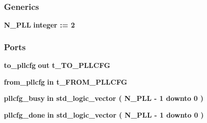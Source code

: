 \subsubsection*{Generics}
 \begin{DoxyCompactItemize}
\item 
{\bf N\+\_\+\+P\+LL} {\bfseries {\bfseries \textcolor{comment}{integer}\textcolor{vhdlchar}{ }\textcolor{vhdlchar}{ }\textcolor{vhdlchar}{\+:}\textcolor{vhdlchar}{=}\textcolor{vhdlchar}{ }\textcolor{vhdlchar}{ } \textcolor{vhdldigit}{2} \textcolor{vhdlchar}{ }}}
\end{DoxyCompactItemize}
\subsubsection*{Ports}
 \begin{DoxyCompactItemize}
\item 
{\bf to\+\_\+pllcfg}  {\bfseries {\bfseries \textcolor{keywordflow}{out}\textcolor{vhdlchar}{ }}} {\bfseries {\bfseries {\bf t\+\_\+\+T\+O\+\_\+\+P\+L\+L\+C\+FG}} \textcolor{vhdlchar}{ }} 
\item 
{\bf from\+\_\+pllcfg}  {\bfseries {\bfseries \textcolor{keywordflow}{in}\textcolor{vhdlchar}{ }}} {\bfseries {\bfseries {\bf t\+\_\+\+F\+R\+O\+M\+\_\+\+P\+L\+L\+C\+FG}} \textcolor{vhdlchar}{ }} 
\item 
{\bf pllcfg\+\_\+busy}  {\bfseries {\bfseries \textcolor{keywordflow}{in}\textcolor{vhdlchar}{ }}} {\bfseries \textcolor{comment}{std\+\_\+logic\+\_\+vector}\textcolor{vhdlchar}{ }\textcolor{vhdlchar}{(}\textcolor{vhdlchar}{ }\textcolor{vhdlchar}{ }\textcolor{vhdlchar}{ }\textcolor{vhdlchar}{ }{\bfseries {\bf N\+\_\+\+P\+LL}} \textcolor{vhdlchar}{-\/}\textcolor{vhdlchar}{ } \textcolor{vhdldigit}{1} \textcolor{vhdlchar}{ }\textcolor{keywordflow}{downto}\textcolor{vhdlchar}{ }\textcolor{vhdlchar}{ } \textcolor{vhdldigit}{0} \textcolor{vhdlchar}{ }\textcolor{vhdlchar}{)}\textcolor{vhdlchar}{ }} 
\item 
{\bf pllcfg\+\_\+done}  {\bfseries {\bfseries \textcolor{keywordflow}{in}\textcolor{vhdlchar}{ }}} {\bfseries \textcolor{comment}{std\+\_\+logic\+\_\+vector}\textcolor{vhdlchar}{ }\textcolor{vhdlchar}{(}\textcolor{vhdlchar}{ }\textcolor{vhdlchar}{ }\textcolor{vhdlchar}{ }\textcolor{vhdlchar}{ }{\bfseries {\bf N\+\_\+\+P\+LL}} \textcolor{vhdlchar}{-\/}\textcolor{vhdlchar}{ } \textcolor{vhdldigit}{1} \textcolor{vhdlchar}{ }\textcolor{keywordflow}{downto}\textcolor{vhdlchar}{ }\textcolor{vhdlchar}{ } \textcolor{vhdldigit}{0} \textcolor{vhdlchar}{ }\textcolor{vhdlchar}{)}\textcolor{vhdlchar}{ }} 

\end{DoxyCompactItemize}
